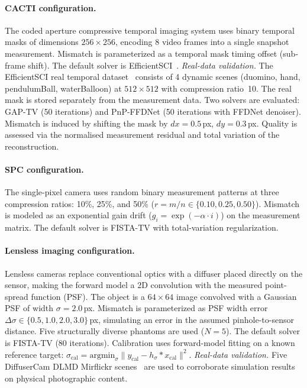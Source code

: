 \paragraph{CACTI configuration.}
The coded aperture compressive temporal imaging system uses binary
temporal masks of dimensions $256 \times 256$, encoding 8 video frames
into a single snapshot measurement.  Mismatch is parameterized as a
temporal mask timing offset (sub-frame shift).  The default solver is
EfficientSCI~\cite{wang2023efficientsci}.
\textit{Real-data validation.}
The EfficientSCI real temporal dataset~\cite{wang2023efficientsci} consists
of 4 dynamic scenes (duomino, hand, pendulumBall, waterBalloon) at
$512 \times 512$ with compression ratio~10.  The real mask is stored
separately from the measurement data.  Two solvers are evaluated:
GAP-TV (50 iterations) and PnP-FFDNet (50 iterations with FFDNet denoiser).
Mismatch is induced by shifting the mask by $dx = 0.5$\,px, $dy = 0.3$\,px.
Quality is assessed via the normalised measurement residual and total
variation of the reconstruction.

\paragraph{SPC configuration.}
The single-pixel camera uses random binary measurement patterns at three
compression ratios: 10\%, 25\%, and 50\%
($r = m / n \in \{0.10, 0.25, 0.50\}$).  Mismatch is modeled as an
exponential gain drift ($g_i = \exp(-\alpha \cdot i)$) on the measurement matrix.  The default solver
is FISTA-TV with total-variation regularization.

\paragraph{Lensless imaging configuration.}
Lensless cameras replace conventional optics with a diffuser placed directly
on the sensor, making the forward model a 2D convolution with the measured
point-spread function (PSF).  The object is a $64 \times 64$ image
convolved with a Gaussian PSF of width $\sigma = 2.0$\,px.  Mismatch is
parameterized as PSF width error
$\Delta\sigma \in \{0.5, 1.0, 2.0, 3.0\}$\,px, simulating an error in
the assumed pinhole-to-sensor distance.  Five structurally diverse phantoms
are used ($N{=}5$).  The default solver is FISTA-TV (80 iterations).
Calibration uses forward-model fitting on a known reference target:
$\sigma_{\mathrm{cal}} = \mathrm{argmin}_\sigma \|y_{\mathrm{cal}} -
h_\sigma * x_{\mathrm{cal}}\|^2$.
\textit{Real-data validation.}
Five DiffuserCam DLMD Mirflickr scenes~\cite{Antipa2018} are used to
corroborate simulation results on physical photographic content.

